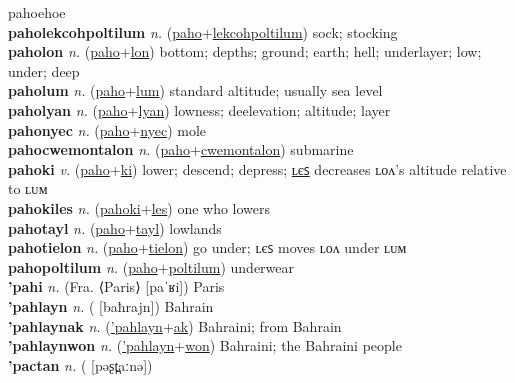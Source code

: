 pahoehoe \label{'pahoehoe} \\
\textbf{paholekcohpoltilum} \textit{n.} (\hyperref[paho]{paho}+\hyperref[lekcohpoltilum]{lekcohpoltilum})
sock; stocking \label{paholekcohpoltilum} \\
\textbf{paholon} \textit{n.} (\hyperref[paho]{paho}+\hyperref[lon]{lon})
bottom; depths; ground; earth; hell; underlayer; low; under; deep \label{paholon} \\
\textbf{paholum} \textit{n.} (\hyperref[paho]{paho}+\hyperref[lum]{lum})
standard altitude; usually sea level \label{paholum} \\
\textbf{paholyan} \textit{n.} (\hyperref[paho]{paho}+\hyperref[lyan]{lyan})
lowness; deelevation; altitude; layer \label{paholyan} \\
\textbf{pahonyec} \textit{n.} (\hyperref[paho]{paho}+\hyperref[nyec]{nyec})
mole \label{pahonyec} \\
\textbf{pahocwemontalon} \textit{n.} (\hyperref[paho]{paho}+\hyperref[cwemontalon]{cwemontalon})
submarine \label{pahocwemontalon} \\
\textbf{pahoki} \textit{v.} (\hyperref[paho]{paho}+\hyperref[ki]{ki})
lower; descend; depress; \hyperref[pahokiles]{ʟєꜱ} decreases ʟᴏᴧ’s altitude relative to ʟᴜᴍ \label{pahoki} \\
\textbf{pahokiles} \textit{n.} (\hyperref[pahoki]{pahoki}+\hyperref[les]{les})
one who lowers \label{pahokiles} \\
\textbf{pahotayl} \textit{n.} (\hyperref[paho]{paho}+\hyperref[tayl]{tayl})
lowlands \label{pahotayl} \\
\textbf{pahotielon} \textit{n.} (\hyperref[paho]{paho}+\hyperref[tielon]{tielon})
go under; ʟєꜱ moves ʟᴏᴧ under ʟᴜᴍ \label{pahotielon} \\
\textbf{pahopoltilum} \textit{n.} (\hyperref[paho]{paho}+\hyperref[poltilum]{poltilum})
underwear \label{pahopoltilum} \\
\textbf{'pahi} \textit{n.} (Fra. ⟨Paris⟩ [paˈʁi])
Paris \label{'pahi} \\
\textbf{'pahlayn} \textit{n.} ( [baħrajn])
Bahrain \label{'pahlayn} \\
\textbf{'pahlaynak} \textit{n.} (\hyperref['pahlayn]{'pahlayn}+\hyperref[ak]{ak})
Bahraini; from Bahrain \label{'pahlaynak} \\
\textbf{'pahlaynwon} \textit{n.} (\hyperref['pahlayn]{'pahlayn}+\hyperref[won]{won})
Bahraini; the Bahraini people \label{'pahlaynwon} \\
\textbf{'pactan} \textit{n.} ( [pəʂt̪aːnə])
